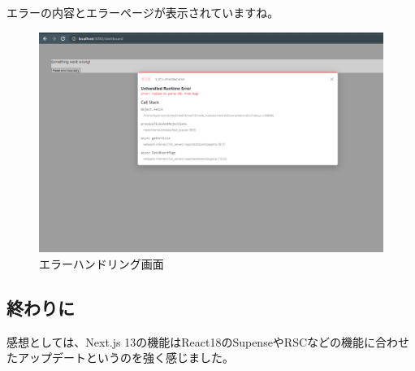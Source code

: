エラーの内容とエラーページが表示されていますね。


\begin{figure}[H]
  \centering
  \includegraphics[width=12cm]{./image/03-Tech/chap4/08.png}
  \caption{エラーハンドリング画面}
\end{figure}



\subsection{終わりに}
感想としては、Next.js 13の機能はReact18のSupenseやRSCなどの機能に合わせたアップデートというのを強く感じました。